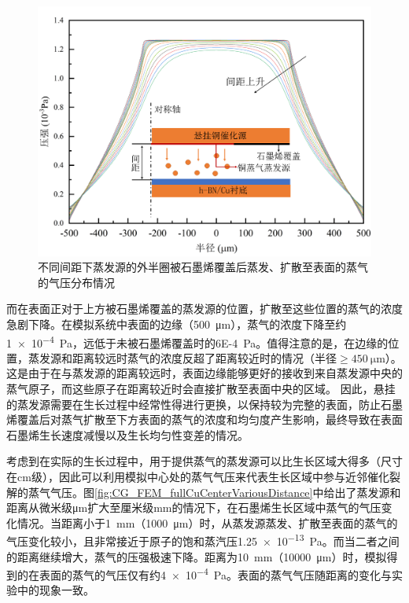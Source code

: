     \begin{figure}[htb]
        \includegraphics{pic/CG_FEM_halfCu.png}
        \caption{不同间距下蒸发源的外半圈被石墨烯覆盖后蒸发、扩散至表面的蒸气的气压分布情况}
        \label{fig:CG_FEM_halfCu}
    \end{figure}

    而在表面正对于上方被石墨烯覆盖的蒸发源的位置，扩散至这些位置的蒸气的浓度急剧下降。在模拟系统中表面的边缘（\SI{500}{\micro\meter}），蒸气的浓度下降至约\SI{1e-4}{\pascal}，远低于未被石墨烯覆盖时的\SI{6E-4}{\pascal}。值得注意的是，在边缘的位置，蒸发源和距离较远时蒸气的浓度反超了距离较近时的情况（半径$\geqslant \SI{450}{\micro\meter}$）。这是由于在与蒸发源的距离较远时，表面边缘能够更好的接收到来自蒸发源中央的蒸气原子，而这些原子在距离较近时会直接扩散至表面中央的区域。
    因此，悬挂的蒸发源需要在生长过程中经常性得进行更换，以保持较为完整的表面，防止石墨烯覆盖后对蒸气扩散至下方表面的蒸气的浓度和均匀度产生影响，最终导致在表面石墨烯生长速度减慢以及生长均匀性变差的情况。

    考虑到在实际的生长过程中，用于提供蒸气的蒸发源可以比生长区域大得多（尺寸在\si{\centi\meter}级），因此可以利用模拟中心处的蒸气气压来代表生长区域中参与近邻催化裂解的蒸气气压。图\ref{fig:CG_FEM_fullCuCenterVariousDistance}中给出了蒸发源和距离从微米级\si{\micro\meter}扩大至厘米级\si{\milli\meter}的情况下，在石墨烯生长区域中蒸气的气压变化情况。当距离小于\SI{1}{\milli\meter}（\SI{1000}{\micro\meter}）时，从蒸发源蒸发、扩散至表面的蒸气的气压变化较小，且非常接近于原子的饱和蒸汽压\SI{1.25e-13}{\pascal}。而当二者之间的距离继续增大，蒸气的压强极速下降。距离为\SI{10}{\milli\meter}（\SI{10000}{\micro\meter}）时，模拟得到的在表面的蒸气的气压仅有约\SI{4e-4}{\pascal}。表面的蒸气气压随距离的变化与实验中的现象一致。
    
